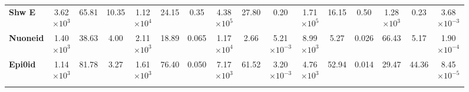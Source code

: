 \begin{sidewaysfigure}[!hb]
\begin{scriptsize}
\begin{tabular}{|l|ccc|ccc|ccc|ccc|ccc|}
\textbf{Shw E}      & 3.62$\times 10^3$           & 65.81                                                               & 10.35                                      & 1.12$\times 10^4$             & 24.15                                                                 & 0.35                                         & 4.38$\times 10^5$              & 27.80                                                                  & 0.20                                          & 1.71$\times 10^5$          & 16.15                                                              & 0.50                                      & 1.28$\times 10^3$             & 0.23                                                                  & 3.68$\times 10^{-3}$                                     \\
\textbf{Nuoneid}      & 1.40$\times 10^3$           & 38.63                                                               & 4.00                                       & 2.11$\times 10^3$             & 18.89                                                                 & 0.065                                        & 1.17$\times 10^4$              & 2.66                                                                   & 5.21$\times 10^{-3}$                                      & 8.99$\times 10^3$          & 5.27                                                               & 0.026                                     & 66.43                & 5.17                                                                  & 1.90$\times 10^{-4}$                                     \\
\textbf{Epi0id}       & 1.14$\times 10^3$           & 81.78                                                               & 3.27                                       & 1.61$\times 10^3$             & 76.40                                                                 & 0.050                                        & 7.17$\times 10^3$              & 61.52                                                                  & 3.20$\times 10^{-3}$                                      & 4.76$\times 10^3$          & 52.94                                                              & 0.014                                     & 29.47                & 44.36                                                                 & 8.45$\times 10^{-5}$                                     \\
\rowcolor[HTML]{67FD9A}

\end{tabular}
\end{scriptsize}
\end{sidewaysfigure}
